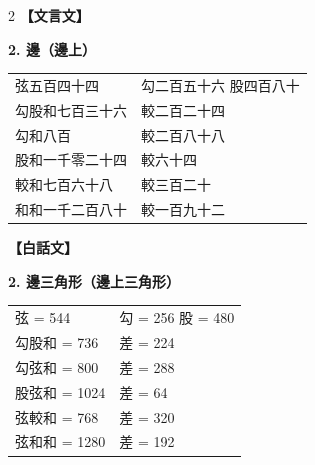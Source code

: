 \documentclass[11pt,a4paper]{article}
\begin{document}
\begin{paracol}{2}
\textbf{【文言文】}

\textbf{2. 邊（邊上）}

\begin{center}
\begin{tabular}{ll}
弦五百四十四 & 勾二百五十六 \quad 股四百八十 \\
勾股和七百三十六 & 較二百二十四 \\
勾和八百 & 較二百八十八 \\
股和一千零二十四 & 較六十四 \\
較和七百六十八 & 較三百二十 \\
和和一千二百八十 & 較一百九十二 \\
\end{tabular}
\end{center}

\switchcolumn
\textbf{【白話文】}

\textbf{2. 邊三角形（邊上三角形）}

\begin{center}
\begin{tabular}{ll}
弦 = 544 & 勾 = 256 \quad 股 = 480 \\
勾股和 = 736 & 差 = 224 \\
勾弦和 = 800 & 差 = 288 \\
股弦和 = 1024 & 差 = 64 \\
弦較和 = 768 & 差 = 320 \\
弦和和 = 1280 & 差 = 192 \\
\end{tabular}
\end{center}
\end{paracol}
\end{document}
